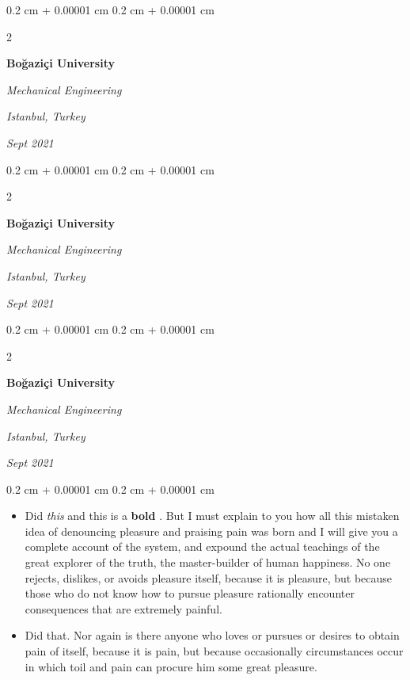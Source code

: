 \documentclass[10pt, letterpaper]{article}
\newenvironment{highlights}{
    \begin{itemize}[
        topsep=0.10 cm,
        parsep=0.10 cm,
        partopsep=0pt,
        itemsep=0pt,
        leftmargin=0.4 cm + 10pt
    ]
}{
    \end{itemize}
} %
\newenvironment{onecolentry}{
    \begin{adjustwidth}{
        0.2 cm + 0.00001 cm
    }{
        0.2 cm + 0.00001 cm
    }
}{
    \end{adjustwidth}
} %
\newenvironment{twocolentry}[2][]{
    \onecolentry
    \def\secondColumn{#2}
    \setcolumnwidth{\fill, 4.5 cm}
    \begin{paracol}{2}
}{
    \switchcolumn \raggedleft \secondColumn
    \end{paracol}
    \endonecolentry
} %
\let\hrefWithoutArrow\href
\renewcommand{\href}[2]{\hrefWithoutArrow{#1}{\ifthenelse{\equal{#2}{}}{ }{#2 }\raisebox{.15ex}{\footnotesize \faExternalLink*}}}
\begin{document}
        \vspace{0.2 cm}

        \begin{twocolentry}{
        \textit{Istanbul, Turkey}    
            
        \textit{Sept 2021}}
            \textbf{Boğaziçi University}

            \textit{Mechanical Engineering}
        \end{twocolentry}



        \vspace{0.2 cm}

        \begin{twocolentry}{
        \textit{Istanbul, Turkey}    
            
        \textit{Sept 2021}}
            \textbf{Boğaziçi University}

            \textit{Mechanical Engineering}
        \end{twocolentry}



        \vspace{0.2 cm}

        \begin{twocolentry}{
        \textit{Istanbul, Turkey}    
            
        \textit{Sept 2021}}
            \textbf{Boğaziçi University}

            \textit{Mechanical Engineering}
        \end{twocolentry}

        \vspace{0.10 cm}
        \begin{onecolentry}
            \begin{highlights}
                \item Did \textit{this} and this is a \textbf{bold} \href{https://example.com}{link}. But I must explain to you how all this mistaken idea of denouncing pleasure and praising pain was born and I will give you a complete account of the system, and expound the actual teachings of the great explorer of the truth, the master-builder of human happiness. No one rejects, dislikes, or avoids pleasure itself, because it is pleasure, but because those who do not know how to pursue pleasure rationally encounter consequences that are extremely painful.
                \item Did that. Nor again is there anyone who loves or pursues or desires to obtain pain of itself, because it is pain, but because occasionally circumstances occur in which toil and pain can procure him some great pleasure.
            \end{highlights}
        \end{onecolentry}
\end{document}

